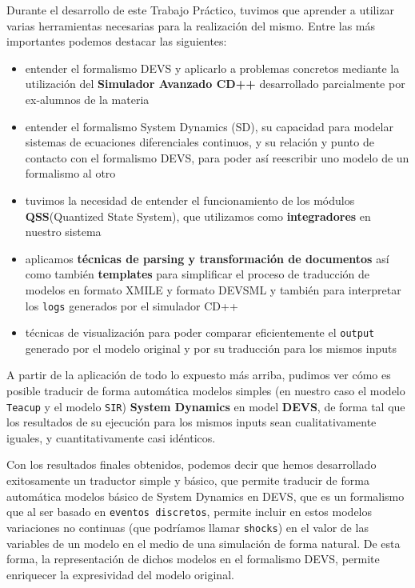 Durante el desarrollo de este Trabajo Práctico, tuvimos que aprender a utilizar varias herramientas necesarias para la realización del mismo. Entre las más importantes podemos destacar las siguientes:
\begin{itemize}
\item entender el formalismo DEVS y aplicarlo a problemas concretos mediante la utilización del \textbf{Simulador Avanzado CD++} desarrollado parcialmente por ex-alumnos de la materia
\item entender el formalismo System Dynamics (SD), su capacidad para modelar sistemas de ecuaciones diferenciales continuos, y su relación y punto de contacto con el formalismo DEVS, para poder así reescribir uno modelo de un formalismo al otro
\item tuvimos la necesidad de entender el funcionamiento de los módulos \textbf{QSS}(Quantized State System), que utilizamos como \textbf{integradores} en nuestro sistema
\item aplicamos \textbf{técnicas de parsing y transformación de documentos} así como también \textbf{templates} para simplificar el proceso de traducción de modelos en formato XMILE y formato DEVSML y también para interpretar los \texttt{logs} generados por el simulador CD++
\item técnicas de visualización para poder comparar eficientemente el \texttt{output} generado por el modelo original y por su traducción para los mismos inputs
\end{itemize}

A partir de la aplicación de todo lo expuesto más arriba, pudimos ver cómo es posible traducir de forma automática modelos simples (en nuestro caso el modelo \texttt{Teacup} y el modelo \texttt{SIR}) \textbf{System Dynamics} en model \textbf{DEVS}, de forma tal que los resultados de su ejecución para los mismos inputs sean cualitativamente iguales, y cuantitativamente casi idénticos.

Con los resultados finales obtenidos, podemos decir que hemos desarrollado exitosamente un traductor simple y básico, que permite traducir de forma automática modelos básico de System Dynamics en DEVS, que es un formalismo que al ser basado en \texttt{eventos discretos}, permite incluir en estos modelos variaciones no continuas (que podríamos llamar \texttt{shocks}) en el valor de las variables de un modelo en el medio de una simulación de forma natural. De esta forma, la representación de dichos modelos en el formalismo DEVS, permite enriquecer la expresividad del modelo original.